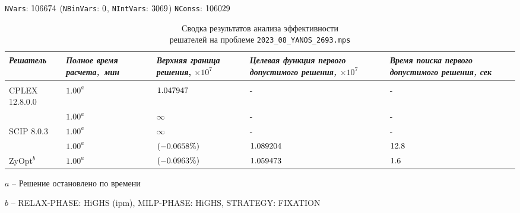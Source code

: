 \documentclass[%
	11pt,
	a4paper,
	utf8,
		]{article}
\begin{document}
\def\firstSolHighsObjB{1.0892041}  %
\def\firstSolHighsTimeB{12.8}
\def\firstSolZyoptObjB{1.0594730}  %
\def\firstSolZyoptTimeB{1.6}

\newcommand{\cplexObjB}{1.0479476651}
\newcommand{\highsObjB}{1.0486380}
\newcommand{\zyoptObjB}{1.0489574}
\newcommand{\cplexZyoptObjRelB}{(\fpeval{\cplexObjB} - \fpeval{\zyoptObjB}) / \fpeval{\cplexObjB} * 100}
\newcommand{\cplexHighsObjRelB}{(\fpeval{\cplexObjB} - \fpeval{\highsObjB}) / \fpeval{\cplexObjB} * 100}

{
	\begin{table}[!h]
		\centering
		\caption{Сводка результатов анализа эффективности \\решателей на проблеме \texttt{2023\_08\_YANOS\_2693.mps}}
		
		{\footnotesize \texttt{NVars}: $ 106674 $ (\texttt{NBinVars}: $ 0 $,  \texttt{NIntVars}: $ 3069 $) \texttt{NConss}: $ 106029 $}\\[2mm]
		
		\begin{tabular}{ p{2.7cm} p{2.5cm} p{3.6cm} p{3.6cm} p{3.2cm} }
			\rowcolor{black!5}\emph{Решатель} & \emph{Полное время \mbox{расчета, мин}} & \emph{Верхняя граница} \mbox{\itshape решения}, $ \times 10^{7} $ & \emph{Целевая функция первого допустимого решения, $ \times 10^7 $} & \emph{Время поиска первого допустимого решения, сек} \\
			\hline\hline\\[-3.5mm]
			{CPLEX 12.8.0.0} & $ 1.00^a $ & $ \fpeval{trunc(\cplexObjB, 6)} $ & - & -\\
			\hline
			\rowcolor{black!5}{CBC} & $ 1.00^a $ & $ \infty $ & - & - \\
			\hline
			{SCIP 8.0.3} & $ 1.00^a $ & $ \infty $ & - & - \\
			\hline
			\rowcolor{black!5}{HiGHS 1.5.3} & $ 1.00^a $ & \ccr{$ \ccr{\fpeval{trunc(\highsObjB, 6)}} $} $ (\fpeval{trunc(\cplexHighsObjRelB, 4)}\%) $ & $ \fpeval{trunc(\firstSolHighsObjB, 6)} $ & $ \fpeval{\firstSolHighsTimeB} $ \\
			\hline
			ZyOpt$^b$ & $ 1.00^a $  & \ccr{$ \fpeval{trunc(\zyoptObjB, 6)} $} $ (\fpeval{trunc(\cplexZyoptObjRelB, 4)}\%) $ & $ \fpeval{trunc(\firstSolZyoptObjB, 6)} $ & $ \fpeval{\firstSolZyoptTimeB} $ \\
		\end{tabular}
	\end{table}
	\vspace*{-3mm}
	\hspace*{5mm}$ a $ -- {\footnotesize Решение остановлено по времени}
	
	\hspace*{5mm}$ b $ -- {\footnotesize RELAX-PHASE: HiGHS (ipm), MILP-PHASE: HiGHS, STRATEGY: FIXATION}
}
\end{document}
